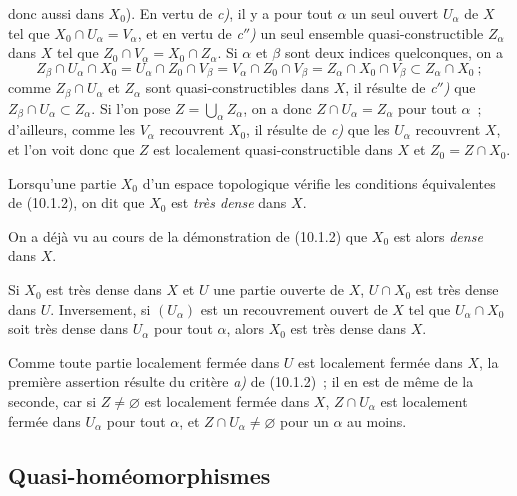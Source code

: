 donc aussi dans $X_0$). En vertu de \emph{c)}, il y a pour tout $\alpha$ un
seul ouvert $U_\alpha$ de $X$ tel que $X_0\cap U_\alpha=V_\alpha$, et en
vertu de \emph{c$''$)} un seul ensemble quasi-constructible $Z_\alpha$ dans
$X$ tel que $Z_0\cap V_\alpha=X_0\cap Z_\alpha$. Si $\alpha$ et $\beta$ sont
deux indices quelconques, on a
\[
Z_\beta\cap U_\alpha\cap X_0
=U_\alpha\cap Z_0\cap V_\beta
=V_\alpha\cap Z_0\cap V_\beta
=Z_\alpha\cap X_0\cap V_\beta
\subset Z_\alpha\cap X_0~;
\]
comme $Z_\beta\cap U_\alpha$ et $Z_\alpha$ sont quasi-constructibles dans
$X$, il résulte de \emph{c$''$)} que
$Z_\beta\cap U_\alpha\subset Z_\alpha$. Si l'on pose
$Z=\bigcup_\alpha Z_\alpha$, on a donc $Z\cap U_\alpha=Z_\alpha$ pour tout
$\alpha$~; d'ailleurs, comme les $V_\alpha$ recouvrent $X_0$, il résulte de
\emph{c)} que les $U_\alpha$ recouvrent $X$, et l'on voit donc que $Z$ est
localement quasi-constructible dans $X$ et $Z_0=Z\cap X_0$.

\begin{definition}[10.1.3]
\label{IV.10.1.3-fr}
Lorsqu'une partie $X_0$ d'un espace topologique vérifie les conditions
équivalentes de (10.1.2), on dit que $X_0$ est \emph{très dense} dans $X$.
\end{definition}

On a déjà vu au cours de la démonstration de (10.1.2) que $X_0$ est alors
\emph{dense} dans $X$.

\begin{corollary}[10.1.4]
\label{IV.10.1.4-fr}
Si $X_0$ est très dense dans $X$ et $U$ une partie ouverte de $X$,
$U\cap X_0$ est très dense dans $U$. Inversement, si $(U_\alpha)$ est un
recouvrement ouvert de $X$ tel que $U_\alpha\cap X_0$ soit très dense dans
$U_\alpha$ pour tout $\alpha$, alors $X_0$ est très dense dans $X$.
\end{corollary}

Comme toute partie localement fermée dans $U$ est localement fermée dans $X$,
la première assertion résulte du critère \emph{a)} de (10.1.2)~; il en est de
même de la seconde, car si $Z\neq\varnothing$ est localement fermée dans $X$,
$Z\cap U_\alpha$ est localement fermée dans $U_\alpha$ pour tout $\alpha$,
et $Z\cap U_\alpha\neq\varnothing$ pour un $\alpha$ au moins.

\subsection{Quasi-homéomorphismes}
\label{subsection:IV.10.2-fr}

